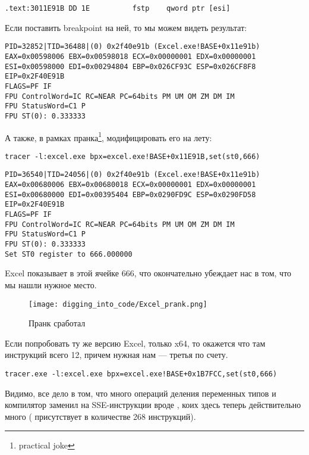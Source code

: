 \begin{lstlisting}[style=customasm]
.text:3011E91B DD 1E          fstp    qword ptr [esi]
\end{lstlisting}

Если поставить breakpoint на ней, то мы можем видеть результат:

\begin{lstlisting}
PID=32852|TID=36488|(0) 0x2f40e91b (Excel.exe!BASE+0x11e91b)
EAX=0x00598006 EBX=0x00598018 ECX=0x00000001 EDX=0x00000001
ESI=0x00598000 EDI=0x00294804 EBP=0x026CF93C ESP=0x026CF8F8
EIP=0x2F40E91B
FLAGS=PF IF
FPU ControlWord=IC RC=NEAR PC=64bits PM UM OM ZM DM IM 
FPU StatusWord=C1 P 
FPU ST(0): 0.333333
\end{lstlisting}

А также, в рамках пранка\footnote{practical joke}, модифицировать его на лету:

\begin{lstlisting}
tracer -l:excel.exe bpx=excel.exe!BASE+0x11E91B,set(st0,666)
\end{lstlisting}

\begin{lstlisting}
PID=36540|TID=24056|(0) 0x2f40e91b (Excel.exe!BASE+0x11e91b)
EAX=0x00680006 EBX=0x00680018 ECX=0x00000001 EDX=0x00000001
ESI=0x00680000 EDI=0x00395404 EBP=0x0290FD9C ESP=0x0290FD58
EIP=0x2F40E91B
FLAGS=PF IF
FPU ControlWord=IC RC=NEAR PC=64bits PM UM OM ZM DM IM 
FPU StatusWord=C1 P 
FPU ST(0): 0.333333
Set ST0 register to 666.000000
\end{lstlisting}

Excel показывает в этой ячейке 666, что окончательно убеждает нас в том, что мы нашли нужное место.

\begin{figure}[H]
\centering
\texttt{[image: digging\_into\_code/Excel\_prank.png]}
\caption{Пранк сработал}
\end{figure}

Если попробовать ту же версию Excel, только x64, то окажется что там инструкций \FDIV всего 12, 
причем нужная нам --- третья по счету.

\begin{lstlisting}
tracer.exe -l:excel.exe bpx=excel.exe!BASE+0x1B7FCC,set(st0,666)
\end{lstlisting}

Видимо, все дело в том, что много операций деления переменных типов \Tfloat и \Tdouble 
компилятор заменил на SSE-инструкции вроде , 
коих здесь теперь действительно много ( присутствует в количестве 268 инструкций).

